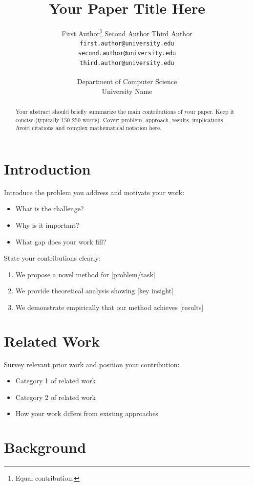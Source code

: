 \documentclass{article}
\title{Your Paper Title Here}
\author{%
  First Author\thanks{Equal contribution.} \And
  Second Author \And
  Third Author \\
  \texttt{first.author@university.edu} \\
  \texttt{second.author@university.edu} \\
  \texttt{third.author@university.edu} \\
  \\
  Department of Computer Science\\
  University Name\\
}
\begin{document}
\maketitle

\begin{abstract}
Your abstract should briefly summarize the main contributions of your paper.
Keep it concise (typically 150-250 words). Cover: problem, approach, results, implications.
Avoid citations and complex mathematical notation here.
\end{abstract}

\section{Introduction}
\label{sec:introduction}

Introduce the problem you address and motivate your work:
\begin{itemize}
    \item What is the challenge?
    \item Why is it important?
    \item What gap does your work fill?
\end{itemize}

State your contributions clearly:

\begin{enumerate}
    \item We propose a novel method for [problem/task]
    \item We provide theoretical analysis showing [key insight]
    \item We demonstrate empirically that our method achieves [results]
\end{enumerate}

\section{Related Work}
\label{sec:related}

Survey relevant prior work and position your contribution:
\begin{itemize}
    \item Category 1 of related work \citep{author2024paper}
    \item Category 2 of related work
    \item How your work differs from existing approaches
\end{itemize}

\section{Background}
\label{sec:background}
\end{document}
